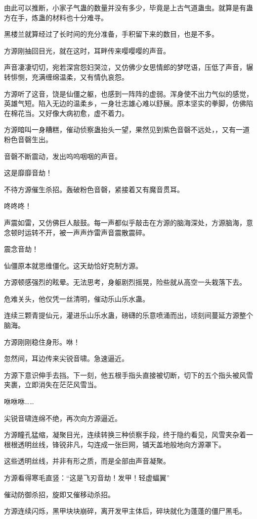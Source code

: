 \begin{this_body}
由此可以推断，小家子气蛊的数量并没有多少，毕竟是上古气道蛊虫。就算是有蛊方在手，炼蛊的材料也十分难寻。

黑楼兰就算经过了长时间的充分准备，手积留下来的数目，也是不多。

方源刚抽回目光，就在这时，耳畔传来嘤嘤嘤的声音。

声音凄凄切切，宛若深宫怨妇哭泣，又仿佛少女思情郎的梦呓语，压低了声音，辗转悱恻，充满缠绵温柔，又有情仇哀怨。

方源听了这音，饶是仙僵之躯，也感到一阵阵的虚弱。浑身使不出力气似的感觉，英雄气短。陷入无边的温柔乡，一身壮志雄心难以舒展。原本坚实的拳脚，仿佛陷在棉花当。又好像大病初愈，虚不着力。

方源暗叫一身糟糕，催动侦察蛊抬头一望，果然见到紫色音磬不远处，，又有一道粉色音磬生出。

音磬不断震动，发出呜呜咽咽的声音。

这是靡靡音劫！

不待方源催生杀招。轰破粉色音磬，紧接着又有魔音贯耳。

咚咚咚！

声震如雷，又仿佛巨人敲鼓。每一声都似乎敲击在方源的脑海深处，方源脑海，意念顿时运转不开，被一声声炸雷声音震散震碎。

震念音劫！

仙僵原本就思维僵化。这天劫恰好克制方源。

方源顿感强烈的眩晕。无法思考，身躯剧烈摇晃，险些就从高空一头栽落下去。

危难关头，他仅凭一丝清明，催动乐山乐水蛊。

连续三颗青提仙元，灌进乐山乐水蛊，磅礴的乐意喷涌而出，顷刻间蔓延方源整个脑海。

方源刚刚稳住身形。咻！

忽然间，耳边传来尖锐音啸。急速逼近。

方源下意识伸手去挡。下一刻，他五根手指头直接被切断，切下的五个指头被风雪夹裹，立即消失在茫茫风雪当。

咻咻咻……

尖锐音啸连绵不绝，再次向方源逼近。

方源瞳孔猛缩，凝聚目光，连续转换三种侦察手段，终于隐约看见，风雪夹杂着一根根透明丝线，锋锐非凡，勾连成一张巨网，铺天盖地般地向方源罩下。

这些透明丝线，并非有形之质，而是全部由声音凝聚。

方源看得寒毛直竖：“这是飞刃音劫！发甲！轻虚蝠翼”

催动防御杀招，旋即又催移动杀招。

方源连续闪烁，黑甲块块崩碎，离开发甲主体后，碎块就化为蓬蓬的僵尸黑毛。


\end{this_body}
